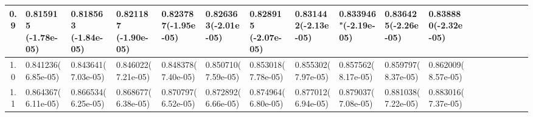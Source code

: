 \documentclass[
	article,			%
	12pt,				%
	twoside,			%
	a4paper,			%
	english,			%
	brazil,				%
	]{abntex2}
\begin{document}
\begin{landscape}
\begin{table}
\begin{tabular}{c||p{17mm}|p{17mm}|p{17mm}|p{17mm}|p{17mm}|p{17mm}|p{17mm}|p{17mm}|p{17mm}|p{17mm}|p{17mm}|p{17mm}|p{17mm}|p{17mm}|p{17mm}|p{17mm}|p{17mm}}
    			0.9 & 0.815915 \newline (-1.78e-05)& 0.818563 \newline (-1.84e-05)& 0.821187 \newline (-1.90e-05) &0.823787\newline(-1.95e-05)& 0.826363\newline (-2.01e-05) & 0.828915 \newline (-2.07e-05)& 0.831442\newline (-2.13e-05)& 0.833946"\newline(-2.19e-05) & 0.836425\newline (-2.26e-05) &0.838880\newline (-2.32e-05)\\
    			\hline\hline
    			1.0 & 0.841236\newline(6.85e-05)& 0.843641\newline(7.03e-05)& 0.846022\newline(7.21e-05)& 0.848378\newline(7.40e-05)& 0.850710\newline(7.59e-05)& 0.853018\newline(7.78e-05)& 0.855302\newline(7.97e-05)& 0.857562\newline(8.17e-05)& 0.859797\newline(8.37e-05)& 0.862009\newline(8.57e-05)\\
    			\hline
    			1.1 & 0.864367\newline(6.11e-05)& 0.866534\newline(6.25e-05)& 0.868677\newline(6.38e-05)& 0.870797\newline(6.52e-05)& 0.872892\newline(6.66e-05)& 0.874964\newline(6.80e-05)& 0.877012\newline(6.94e-05)& 0.879037\newline(7.08e-05)& 0.881038\newline(7.22e-05)& 0.883016\newline(7.37e-05)\\
    			\hline
    			

\end{tabular}
\end{table}
\end{landscape}
\end{document}
